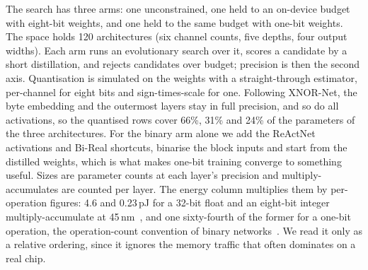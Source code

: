 \documentclass{llncs}
\begin{document}
The search has three arms: one unconstrained, one held to an on-device budget
with eight-bit weights, and one held to the same budget with one-bit weights. The
space holds 120 architectures (six channel counts, five depths, four output
widths). Each arm runs an evolutionary search over it, scores a candidate by a
short distillation, and rejects candidates over budget; precision is then the
second axis. Quantisation is simulated on the weights with a straight-through
estimator, per-channel for eight bits and sign-times-scale for one. Following
XNOR-Net, the byte embedding and the outermost layers stay in full precision, and
so do all activations, so the quantised rows cover 66\%, 31\% and 24\% of the
parameters of the three architectures. For the binary arm alone we add the
ReActNet activations and Bi-Real shortcuts, binarise the block inputs and start
from the distilled weights, which is what makes one-bit training converge to
something useful. Sizes are parameter counts at each layer's precision and
multiply-accumulates are counted per layer. The energy column multiplies them by
per-operation figures: 4.6 and 0.23\,pJ for a 32-bit float and an eight-bit
integer multiply-accumulate at 45\,nm~\cite{horowitz2014}, and one sixty-fourth of
the former for a one-bit operation, the operation-count convention of binary
networks~\cite{rastegari2016xnor,liu2018bireal}. We read it only as a relative
ordering, since it ignores the memory traffic that often dominates on a real chip.
\end{document}
